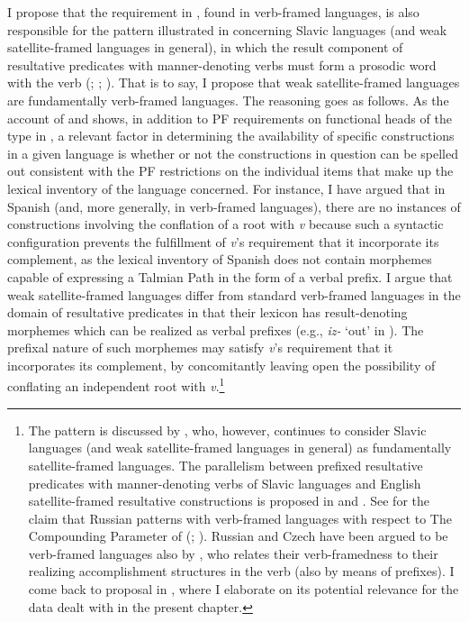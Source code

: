 \documentclass[output=paper,colorlinks,citecolor=brown]{langscibook}
\begin{document}
I propose that the requirement in , found in verb-framed languages, is also responsible for the pattern illustrated in  concerning Slavic languages (and weak satellite-framed languages in general), in which the result component of resultative predicates with manner-denoting verbs must form a prosodic word with the verb (\citealt{Talmy2000}; \citealt{Acedo-Matellan2010}; \citeyear{Acedo-Matellan2016}). That is to say, I propose that weak satellite-framed languages are fundamentally verb-framed languages. The reasoning goes as follows. As the account of  and  shows, in addition to PF requirements on functional heads of the type in , a relevant factor in determining the availability of specific constructions in a given language is whether or not the constructions in question can be spelled out consistent with the PF restrictions on the individual items that make up the lexical inventory of the language concerned. For instance, I have argued that in Spanish (and, more generally, in verb-framed languages), there are no instances of constructions involving the conflation of a root with \textit{v} because such a syntactic configuration prevents the fulfillment of \textit{v}'s requirement that it incorporate its complement, as the lexical inventory of Spanish does not contain morphemes capable of expressing a Talmian Path in the form of a verbal prefix. I argue that weak satellite-framed languages differ from standard verb-framed languages in the domain of resultative predicates in that their lexicon has result-denoting morphemes which can be realized as verbal prefixes (e.g., \textit{iz-} `out' in ). The prefixal nature of such morphemes may satisfy \textit{v}'s requirement that it incorporates its complement, by concomitantly leaving open the possibility of conflating an independent root with \textit{v}.\footnote{The pattern is discussed by \citet{Mateu2017}, who, however, continues to consider Slavic languages (and weak satellite-framed languages in general) as fundamentally satellite-framed languages. The parallelism between prefixed resultative predicates with manner-denoting verbs of Slavic languages and English satellite-framed resultative constructions is proposed in \citet{Spencerandzaretskaya1998} and \citet{Mateu2008}. See \citet{Snyder2012} for the claim that Russian patterns with verb-framed languages with respect to The Compounding Parameter of \citeauthor{Snyder1995} (\citeyear{Snyder1995}; \citeyear{Snyder2001}). Russian and Czech have been argued to be verb-framed languages also by \citet{big:Gehrke2008}, who relates their verb-framedness to their realizing accomplishment structures in the verb (also by means of prefixes). I come back to  proposal in , where I elaborate on its potential relevance %
for the data dealt with in the present chapter. %
} 
\end{document}
